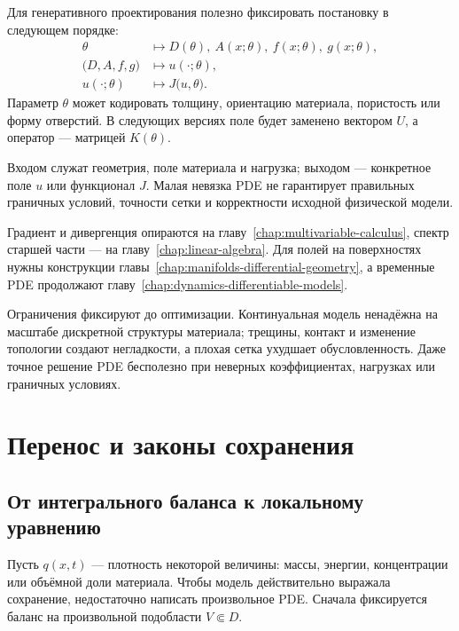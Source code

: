 Для генеративного проектирования полезно фиксировать постановку в следующем порядке:
\[
\begin{aligned}
\theta
&\longmapsto
D(\theta),\ A(x;\theta),\ f(x;\theta),\ g(x;\theta),\\
\bigl(D,A,f,g\bigr)
&\longmapsto
u(\cdot;\theta),\\
u(\cdot;\theta)
&\longmapsto
J\bigl(u,\theta\bigr).
\end{aligned}
\]
Параметр $\theta$ может кодировать толщину, ориентацию материала, пористость или форму отверстий. В следующих версиях поле будет заменено вектором $U$, а оператор --- матрицей $K(\theta)$.

\begin{mlconnection}
Входом служат геометрия, поле материала и нагрузка; выходом --- конкретное поле $u$ или функционал $J$. Малая невязка PDE не гарантирует правильных граничных условий, точности сетки и корректности исходной физической модели.
\end{mlconnection}

Градиент и дивергенция опираются на главу~\ref{chap:multivariable-calculus}, спектр старшей части --- на главу~\ref{chap:linear-algebra}. Для полей на поверхностях нужны конструкции главы~\ref{chap:manifolds-differential-geometry}, а временные PDE продолжают главу~\ref{chap:dynamics-differentiable-models}.

Ограничения фиксируют до оптимизации. Континуальная модель ненадёжна на масштабе дискретной структуры материала; трещины, контакт и изменение топологии создают негладкости, а плохая сетка ухудшает обусловленность. Даже точное решение PDE бесполезно при неверных коэффициентах, нагрузках или граничных условиях.


\section{Перенос и законы сохранения}
\label{sec:pde-transport-and-conservation}

\subsection{От интегрального баланса к локальному уравнению}

Пусть $q(x,t)$ --- плотность некоторой величины: массы, энергии, концентрации или объёмной доли материала. Чтобы модель действительно выражала сохранение, недостаточно написать произвольное PDE. Сначала фиксируется баланс на произвольной подобласти $V\Subset D$.

